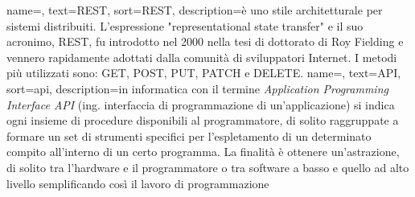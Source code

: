 






{
    name=,
    text=REST,
    sort=REST,
    description={è uno stile architetturale per sistemi distribuiti. L'espressione "representational state transfer" e il suo acronimo, REST, fu introdotto nel 2000 nella tesi di dottorato di Roy Fielding e vennero rapidamente adottati dalla comunità di sviluppatori Internet. I metodi più utilizzati sono: GET, POST, PUT, PATCH e DELETE.}
}
{
    name=,
    text=API,
    sort=api,
    description={in informatica con il termine \emph{Application Programming Interface API} (ing. interfaccia di programmazione di un'applicazione) si indica ogni insieme di procedure disponibili al programmatore, di solito raggruppate a formare un set di strumenti specifici per l'espletamento di un determinato compito all'interno di un certo programma. La finalità è ottenere un'astrazione, di solito tra l'hardware e il programmatore o tra software a basso e quello ad alto livello semplificando così il lavoro di programmazione}
}

